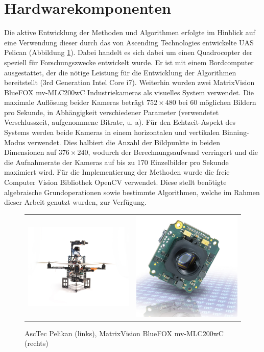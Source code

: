 \section{Hardwarekomponenten}
\label{sec:setup}

Die aktive Entwicklung der Methoden und Algorithmen erfolgte im Hinblick auf eine Verwendung dieser durch das von Ascending Technologies \cite{asctec} entwickelte UAS Pelican (Abbildung \ref{img:pelican}). Dabei handelt es sich dabei um einen Quadrocopter der speziell für Forschungszwecke entwickelt wurde. Er ist mit einem Bordcomputer ausgestattet, der die nötige Leistung für die Entwicklung der Algorithmen bereitstellt (3rd Generation Intel Core i7). Weiterhin wurden zwei MatrixVision BlueFOX mv-MLC200wC Industriekameras \cite{matrixvision} als visuelles System verwendet. Die maximale Auflösung beider Kameras beträgt $752\times480$ bei 60 möglichen Bildern pro Sekunde, in Abhängigkeit verschiedener Parameter (verwendetet Verschlusszeit, aufgenommene Bitrate, u. a). Für den Echtzeit-Aspekt des Systems werden beide Kameras in einem horizontalen und vertikalen Binning-Modus verwendet. Dies halbiert die Anzahl der Bildpunkte in beiden Dimensionen auf $376\times240$, wodurch der Berechnungsaufwand verringert und die die Aufnahmerate der Kameras auf bis zu 170 Einzelbilder pro Sekunde maximiert wird.
\noindent
Für die Implementierung der Methoden wurde die freie Computer Vision Bibliothek OpenCV \cite{opencv} verwendet. Diese stellt benötigte algebraische Grundoperationen sowie bestimmte Algorithmen, welche im Rahmen dieser Arbeit genutzt wurden, zur Verfügung.
\begin{figure}[h]
	\centering
	\begin{tabular}{cc}
	\includegraphics[width=6cm]{img/pelican} &
	\includegraphics[width=6cm]{img/camera}
	\end{tabular}
	\caption{AscTec Pelikan (links), MatrixVision BlueFOX mv-MLC200wC (rechts)}
	\label{img:pelican}
\end{figure}



